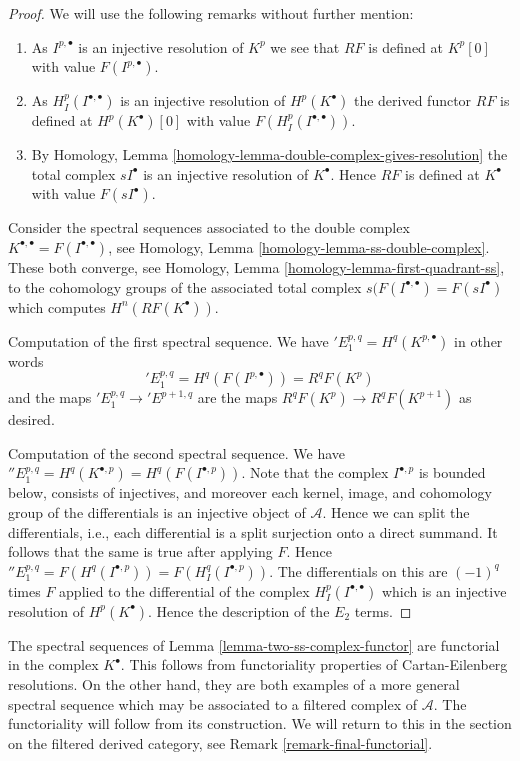 \begin{proof}
We will use the following remarks without further mention:
\begin{enumerate}
\item As $I^{p, \bullet}$ is an injective resolution of
$K^p$ we see that $RF$ is defined at $K^p[0]$
with value $F(I^{p, \bullet})$.
\item As $H^p_I(I^{\bullet, \bullet})$ is an injective resolution of
$H^p(K^\bullet)$ the derived functor $RF$ is defined at $H^p(K^\bullet)[0]$
with value $F(H^p_I(I^{\bullet, \bullet}))$.
\item By
Homology, Lemma \ref{homology-lemma-double-complex-gives-resolution}
the total complex $sI^\bullet$ is an injective resolution of
$K^\bullet$. Hence $RF$ is defined at $K^\bullet$ with value
$F(sI^\bullet)$.
\end{enumerate}
Consider the spectral sequences associated to
the double complex $K^{\bullet, \bullet} = F(I^{\bullet, \bullet})$, see
Homology, Lemma \ref{homology-lemma-ss-double-complex}.
These both converge, see
Homology, Lemma \ref{homology-lemma-first-quadrant-ss},
to the cohomology groups of the associated total complex
$s(F(I^{\bullet, \bullet}) = F(sI^\bullet)$ which computes
$H^n(RF(K^\bullet))$.

\medskip\noindent
Computation of the first spectral sequence. We have
${}'E_1^{p, q} = H^q(K^{p, \bullet})$ in other words
$$
{}'E_1^{p, q} = H^q(F(I^{p, \bullet})) = R^qF(K^p)
$$
and the maps ${}'E_1^{p, q} \to {}'E^{p + 1, q}$ are the maps
$R^qF(K^p) \to R^qF(K^{p + 1})$ as desired.

\medskip\noindent
Computation of the second spectral sequence. We have
${}''E_1^{p, q} = H^q(K^{\bullet, p}) = H^q(F(I^{\bullet, p}))$.
Note that the complex $I^{\bullet, p}$ is bounded below,
consists of injectives, and moreover each kernel, image, and
cohomology group of the differentials is an injective object
of $\mathcal{A}$. Hence we can split the differentials, i.e.,
each differential is a split surjection onto a direct summand.
It follows that the same is true after applying $F$. Hence
${}''E_1^{p, q} = F(H^q(I^{\bullet, p})) = F(H^q_I(I^{\bullet, p}))$.
The differentials on this are $(-1)^q$ times $F$ applied to
the differential of the complex $H^p_I(I^{\bullet, \bullet})$
which is an injective resolution of $H^p(K^\bullet)$. Hence the
description of the $E_2$ terms.
\end{proof}

\begin{remark}
\label{remark-functorial-ss}
The spectral sequences of Lemma \ref{lemma-two-ss-complex-functor}
are functorial in the complex $K^\bullet$. This follows from functoriality
properties of Cartan-Eilenberg resolutions. On the other hand, they are
both examples of a more general spectral sequence which may be associated
to a filtered complex of $\mathcal{A}$. The functoriality will follow from
its construction. We will return to this in the section on the filtered
derived category, see Remark \ref{remark-final-functorial}.
\end{remark}










